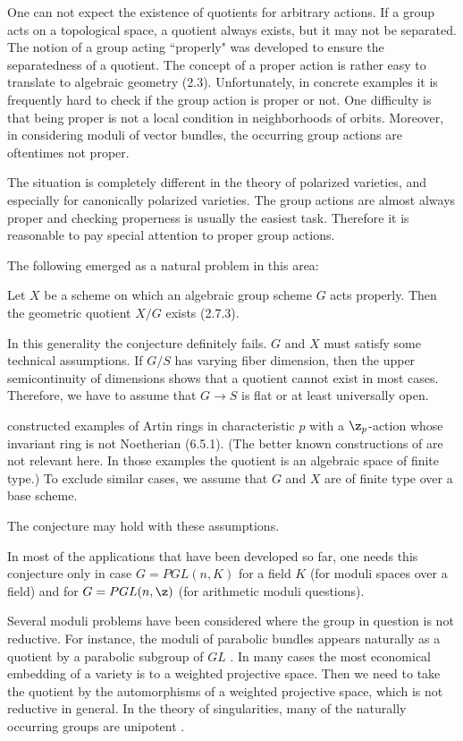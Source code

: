 One can not expect the existence of quotients for arbitrary actions.  If a
group acts on a topological space, a quotient always exists, but it may not be
separated.   The notion of a group acting ``properly" was developed
to ensure the separatedness of a quotient. The concept of a proper
action is rather easy to translate to algebraic geometry (2.3).
Unfortunately, in concrete examples it is frequently hard to check if
the group action is proper or not. One difficulty is that being proper is not
a local condition in neighborhoods of orbits.
Moreover, in considering moduli of vector bundles, the occurring group actions
are oftentimes not proper.

The situation is completely
different in the theory of polarized varieties, and especially
for canonically polarized varieties. The group actions are almost always
proper and checking properness is usually the easiest task. Therefore it
is reasonable to pay special attention to  proper group actions.

The following emerged as  a natural  problem in this area:



  Let $X$ be a scheme on which an algebraic group
scheme $G$ acts properly. Then the geometric quotient  $X/G$ exists (2.7.3).
\endproclaim


 In this generality the conjecture definitely fails.
$G$  and   $X$  must satisfy some    technical assumptions.
If $G/S$ has varying fiber dimension, then  the upper semicontinuity
of dimensions shows that a quotient cannot exist in most cases.  Therefore,
  we have to assume that  $G\to S$ is flat or
at least universally open.

 \cite{Nagata69} constructed
examples of   Artin rings in characteristic $p$  with a
$\z_p$-action whose invariant ring  is not  Noetherian (6.5.1).
(The better known constructions of \cite{Nagata59} are  not relevant
here. In those examples the quotient is an algebraic space of finite type.) To
exclude similar cases, we assume that
$G$ and $X$ are of finite type over a base scheme.

The conjecture may  hold with these assumptions.
\enddemo


 In most  of the applications that have been
developed so far, one needs this conjecture only in case $G=PGL(n,K)$ for
a field $K$ (for moduli spaces over a field) and for $G=PGL(n,\z)$ (for
arithmetic moduli questions).

Several moduli problems have been considered  where the group in
question is not reductive. For instance, the moduli of parabolic bundles
appears naturally as  a quotient by a parabolic subgroup of $GL$
\cite{Seshadri82}. In many cases the most economical embedding of a variety is
to a weighted projective space. Then we need to take the quotient  by the
automorphisms of a weighted projective space, which is not reductive
in general.
In the theory  of singularities, many of the naturally
occurring groups are unipotent \cite{Greuel-Pfister93}.
\enddemo


